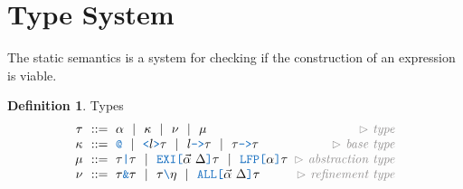 \documentclass[acmsmall]{acmart}
\theoremstyle{definition}
\newtheorem{definition}{Definition}[section]
\begin{document}
\section{Type System}
The static semantics is a system for checking if the construction of an expression is viable.   

\hfill
\begin{definition} Types 
  \label{def:types}
  \[\begin{array}[t]{r@{}l@{}r}
    \nonterm{\tau} & \is 
    \begin{array}[t]{@{}l}
      \alpha \sep
      \kappa \sep \nu \sep \mu
    \end{array}
    & \com{type}
    \\
    \nonterm{\kappa} & \is 
    \begin{array}[t]{@{}l}
      \obj{@} \sep
      \obj{<}l\obj{>}\tau \sep 
      l\obj{->}\tau \sep 
      \tau\obj{->}\tau
    \end{array}
    & \com{base type}
    \\
    \nonterm{\mu} & \is 
    \begin{array}[t]{@{}l}
      \tau\obj{|}\tau \sep 
      \obj{EXI[}\vec{\alpha}\ \Delta \obj{]} \tau \sep 
      \obj{LFP[}\alpha\obj{]}\tau
    \end{array}
    & \com{abstraction type}
    \\
    \nonterm{\nu} & \is 
    \begin{array}[t]{@{}l}
      \tau\obj{\&}\tau \sep 
      \tau\obj{\textbackslash}\eta \sep 
      \obj{ALL[}\vec{\alpha}\ \Delta \obj{]} \tau
    \end{array}
    & \com{refinement type}
    \\\\

\end{array}\]
\end{definition}
\end{document}
